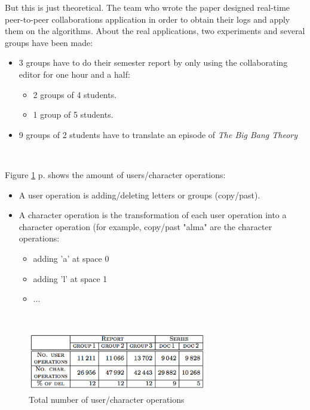 But this is just theoretical. The team who wrote the paper designed real-time peer-to-peer collaborations application in order to obtain their logs and apply them on the algorithms. About the real applications, two experiments and several groups have been made:
\begin{itemize}
	\item 3 groups have to do their semester report by only using the collaborating editor for one hour and a half:
		\begin{itemize}
			\item 2 groups of 4 students.
			\item 1 group of 5 students.
		\end{itemize}
	\item 9 groups of 2 students have to translate an episode of \emph{The Big Bang Theory}
\end{itemize}~

Figure \ref{fig:operations} p.\pageref{fig:operations} shows the amount of users/character operations:
\begin{itemize}
	\item A user operation is adding/deleting letters or groups (copy/past).
	\item A character operation is the transformation of each user operation into a character operation (for example, copy/past "alma" are the character operations: \begin{itemize}
					\item adding 'a' at space 0
					\item adding 'l' at space 1
					\item ...
				\end{itemize}
\end{itemize}~

\begin{figure}[h]
  \center
  \includegraphics[width=0.7\textwidth]{includes/operations.png}
  \caption{Total number of user/character operations}
  \label{fig:operations}
\end{figure}